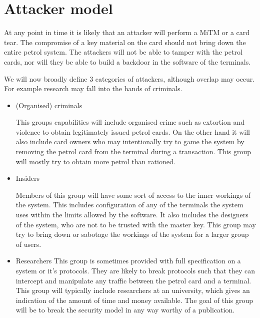 \section{Attacker model}
At any point in time it is likely that an attacker will perform a MiTM or a card tear. The compromise of a key material on the card should not bring down the entire petrol system. The attackers will not be able to tamper with the petrol cards, nor will they be able to build a backdoor in the software of the terminals.

We will now broadly define $3$ categories of attackers, although overlap may occur. For example research may fall into the hands of criminals. 

\begin{itemize}

\item (Organised) criminals

This groups capabilities will include organised crime such as extortion and violence to obtain legitimately issued petrol cards. On the other hand it will also include card owners who may intentionally try to game the system by removing the petrol card from the terminal during a transaction. This group will mostly try to obtain more petrol than rationed.

\item Insiders

Members of this group will have some sort of access to the inner workings of the system. This includes configuration of any of the terminals the system uses within the limits allowed by the software. It also includes the designers of the system, who are not to be trusted with the master key. This group may try to bring down or sabotage the workings of the system for a larger group of users.

\item Researchers
This group is sometimes provided with full specification on a system or it's protocols. They are likely to break protocols such that they can intercept and manipulate any traffic between the petrol card and a terminal. This group will typically include researchers at an university, which gives an indication of the amount of time and money available. The goal of this group will be to break the security model in any way worthy of a publication.
 
\end{itemize}